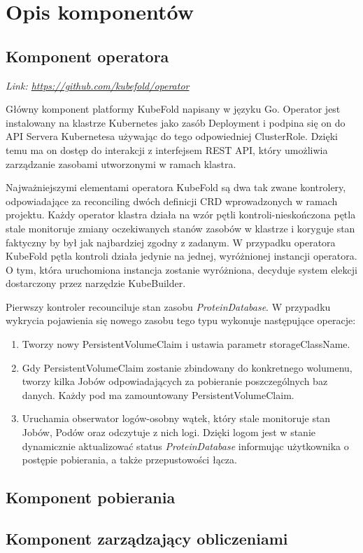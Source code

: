 \section{Opis komponentów}

\subsection{Komponent operatora}\label{subsec:component-operator}
\textit{Link: \url{https://github.com/kubefold/operator}}

Główny komponent platformy KubeFold napisany w języku Go.
Operator jest instalowany na klastrze Kubernetes jako zasób Deployment i podpina się on do API Servera Kubernetesa używając do tego odpowiedniej ClusterRole.
Dzięki temu ma on dostęp do interakcji z interfejsem REST API, który umożliwia zarządzanie zasobami utworzonymi w ramach klastra.

Najważniejszymi elementami operatora KubeFold są dwa tak zwane kontrolery, odpowiadające za reconciling dwóch definicji CRD wprowadzonych w ramach projektu.
Każdy operator klastra działa na wzór pętli kontroli-nieskończona pętla stale monitoruje zmiany oczekiwanych stanów zasobów w klastrze i koryguje stan faktyczny by był jak najbardziej zgodny z zadanym.
W przypadku operatora KubeFold pętla kontroli działa jedynie na jednej, wyróżnionej instancji operatora.
O tym, która uruchomiona instancja zostanie wyróżniona, decyduje system elekcji dostarczony przez narzędzie KubeBuilder.

Pierwszy kontroler recounciluje stan zasobu \textit{ProteinDatabase}.
W przypadku wykrycia pojawienia się nowego zasobu tego typu wykonuje następujące operacje:
\begin{enumerate}
    \item Tworzy nowy PersistentVolumeClaim i ustawia parametr storageClassName.
    \item Gdy PersistentVolumeClaim zostanie zbindowany do konkretnego wolumenu, tworzy kilka Jobów odpowiadających za pobieranie poszczególnych baz danych.
    Każdy pod ma zamountowany PersistentVolumeClaim.
    \item Uruchamia obserwator logów-osobny wątek, który stale monitoruje stan Jobów, Podów oraz odczytuje z nich logi.
    Dzięki logom jest w stanie dynamicznie aktualizować status \textit{ProteinDatabase} informując użytkownika o postępie pobierania, a także przepustowości łącza.
\end{enumerate}

\subsection{Komponent pobierania}\label{subsec:component-downloader}

\subsection{Komponent zarządzający obliczeniami}\label{subsec:component-manager}